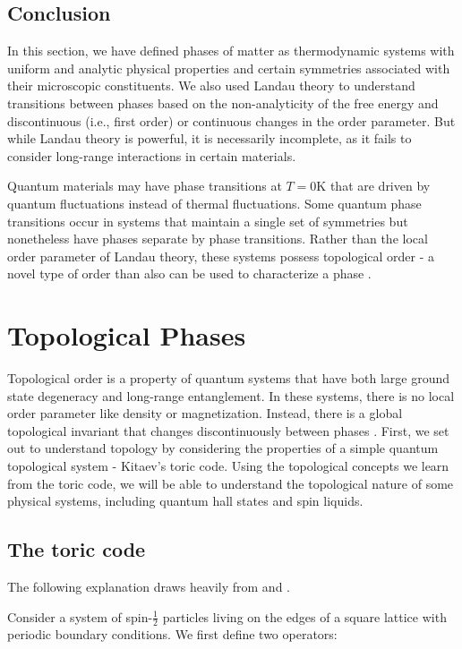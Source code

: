 \subsection{Conclusion}
In this section, we have defined phases of matter as thermodynamic systems with uniform and analytic physical properties and certain symmetries associated with their microscopic constituents. We also used Landau theory to understand transitions between phases based on the non-analyticity of the free energy and discontinuous (i.e., first order) or continuous changes in the order parameter. But while Landau theory is powerful, it is necessarily incomplete, as it fails to consider long-range interactions in certain materials.

Quantum materials may have phase transitions at $T = 0$K that are driven by quantum fluctuations instead of thermal fluctuations. Some quantum phase transitions occur in systems that maintain a single set of symmetries but nonetheless have phases separate by phase transitions. Rather than the local order parameter of Landau theory, these systems possess topological order - a novel type of order than also can be used to characterize a phase \cite{Wen1990}.

\section{Topological Phases}

Topological order is a property of quantum systems that have both large ground state degeneracy and long-range entanglement. In these systems, there is no local order parameter like density or magnetization. Instead, there is a global topological invariant that changes discontinuously between phases \cite{Wen2017}. First, we set out to understand topology by considering the properties of a simple quantum topological system - Kitaev's toric code. Using the topological concepts we learn from the toric code, we will be able to understand the topological nature of some physical systems, including quantum hall states and spin liquids.

\subsection{The toric code}

The following explanation draws heavily from \cite{Kitaev2003} and \cite{topOrderEdX}.

Consider a system of spin-$\frac{1}{2}$ particles living on the edges of a square lattice with periodic boundary conditions. We first define two operators:

